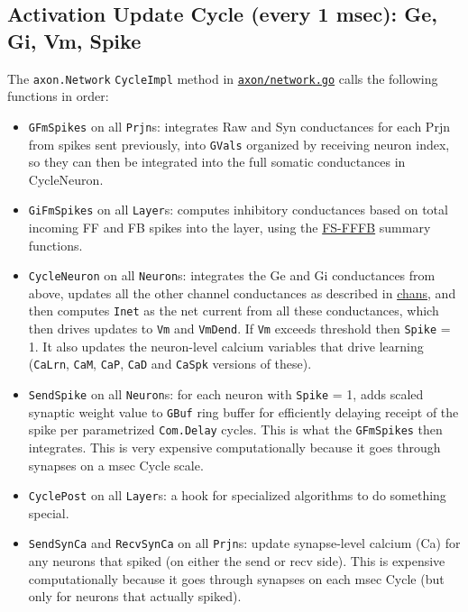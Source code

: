 \documentclass[11pt,twoside]{article}
\newif\myifpdf
\begin{document}
\hypertarget{activation-update-cycle-every-1-msec-ge-gi-vm-spike}{%
\subsection{Activation Update Cycle (every 1 msec): Ge, Gi, Vm,
Spike}\label{activation-update-cycle-every-1-msec-ge-gi-vm-spike}}

The \texttt{axon.Network} \texttt{CycleImpl} method in
\href{https://github.com/emer/axon/blob/master/axon/network.go}{\texttt{axon/network.go}}
calls the following functions in order:

\begin{itemize}
\item
  \texttt{GFmSpikes} on all \texttt{Prjn}s: integrates Raw and Syn
  conductances for each Prjn from spikes sent previously, into
  \texttt{GVals} organized by receiving neuron index, so they can then
  be integrated into the full somatic conductances in CycleNeuron.
\item
  \texttt{GiFmSpikes} on all \texttt{Layer}s: computes inhibitory
  conductances based on total incoming FF and FB spikes into the layer,
  using the
  \href{https://github.com/emer/axon/tree/master/fsfffb}{FS-FFFB}
  summary functions.
\item
  \texttt{CycleNeuron} on all \texttt{Neuron}s: integrates the Ge and Gi
  conductances from above, updates all the other channel conductances as
  described in
  \href{https://github.com/emer/axon/tree/master/chans}{chans}, and then
  computes \texttt{Inet} as the net current from all these conductances,
  which then drives updates to \texttt{Vm} and \texttt{VmDend}. If
  \texttt{Vm} exceeds threshold then \texttt{Spike} = 1. It also updates
  the neuron-level calcium variables that drive learning
  (\texttt{CaLrn}, \texttt{CaM}, \texttt{CaP}, \texttt{CaD} and
  \texttt{CaSpk} versions of these).
\item
  \texttt{SendSpike} on all \texttt{Neuron}s: for each neuron with
  \texttt{Spike} = 1, adds scaled synaptic weight value to \texttt{GBuf}
  ring buffer for efficiently delaying receipt of the spike per
  parametrized \texttt{Com.Delay} cycles. This is what the
  \texttt{GFmSpikes} then integrates. This is very expensive
  computationally because it goes through synapses on a msec Cycle
  scale.
\item
  \texttt{CyclePost} on all \texttt{Layer}s: a hook for specialized
  algorithms to do something special.
\item
  \texttt{SendSynCa} and \texttt{RecvSynCa} on all \texttt{Prjn}s:
  update synapse-level calcium (Ca) for any neurons that spiked (on
  either the send or recv side). This is expensive computationally
  because it goes through synapses on each msec Cycle (but only for
  neurons that actually spiked).
\end{itemize}
\end{document}
